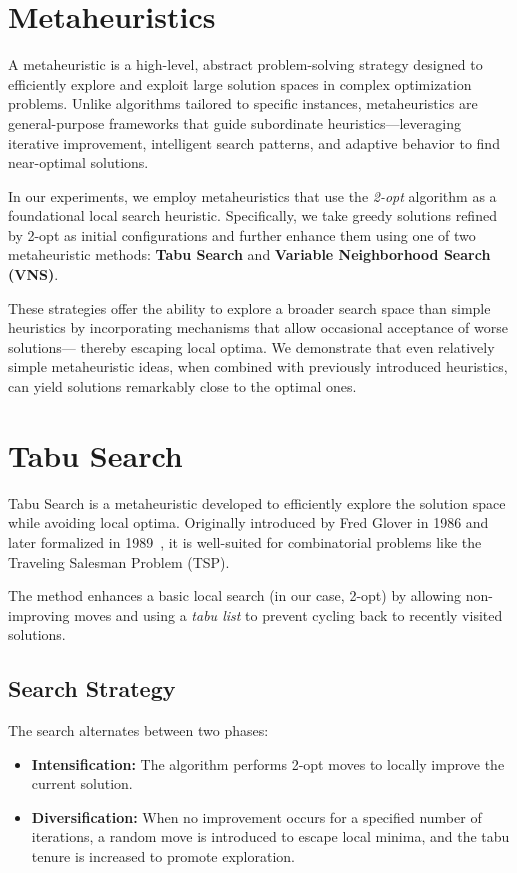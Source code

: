 \section{Metaheuristics}

A metaheuristic is a high-level, abstract problem-solving strategy designed to efficiently explore and exploit large solution spaces 
in complex optimization problems. Unlike algorithms tailored to specific instances, metaheuristics are general-purpose frameworks 
that guide subordinate heuristics—leveraging iterative improvement, intelligent search patterns, and adaptive behavior to find near-optimal solutions.

In our experiments, we employ metaheuristics that use the \textit{2-opt} algorithm as a foundational local search heuristic. 
Specifically, we take greedy solutions refined by 2-opt as initial configurations and further enhance them using one of two metaheuristic methods: 
\textbf{Tabu Search} and \textbf{Variable Neighborhood Search (VNS)}.

These strategies offer the ability to explore a broader search space than simple heuristics by incorporating mechanisms that allow 
occasional acceptance of worse solutions— thereby escaping local optima. We demonstrate that even relatively simple metaheuristic ideas, 
when combined with previously introduced heuristics, can yield solutions remarkably close to the optimal ones.

\section{Tabu Search}

Tabu Search is a metaheuristic developed to efficiently explore the solution space while avoiding local optima. 
Originally introduced by Fred Glover in 1986 and later formalized in 1989~\cite{Glover:TabuSearch}, it is well-suited for combinatorial problems like the Traveling Salesman Problem (TSP).

The method enhances a basic local search (in our case, 2-opt) by allowing non-improving moves and using a \textit{tabu list} to prevent cycling back to recently visited solutions.

\subsection{Search Strategy}

The search alternates between two phases:
\begin{itemize}
    \item \textbf{Intensification:} The algorithm performs 2-opt moves to locally improve the current solution.
    \item \textbf{Diversification:} When no improvement occurs for a specified number of iterations, a random move is introduced to escape local minima, 
        and the tabu tenure is increased to promote exploration.
\end{itemize}

